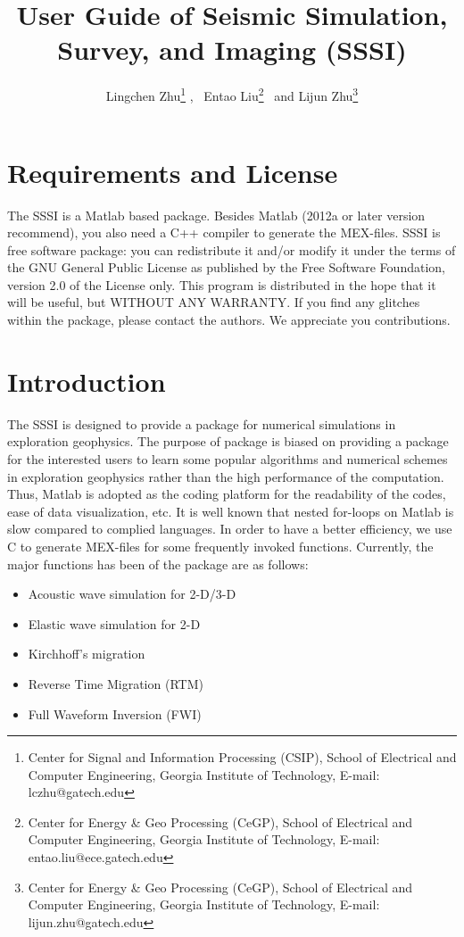 \documentclass[11pt]{article}
\theoremstyle{plain}
\theoremstyle{definition}
\theoremstyle{remark}
\numberwithin{equation}{section}
\begin{document}
\title{User Guide of Seismic Simulation, Survey, and Imaging (SSSI)}
\author{Lingchen Zhu\thanks{Center for Signal and Information Processing (CSIP), School of Electrical and Computer Engineering, Georgia Institute of Technology, 
E-mail: lczhu@gatech.edu} , \, Entao Liu\thanks{Center for Energy \& Geo Processing (CeGP), School of Electrical and Computer Engineering, Georgia Institute of Technology, E-mail: entao.liu@ece.gatech.edu} \, and Lijun Zhu\thanks{Center for Energy \& Geo Processing (CeGP), School of Electrical and Computer Engineering, Georgia Institute of Technology, E-mail: lijun.zhu@gatech.edu}} \maketitle
\tableofcontents
\newpage



\section{Requirements and License}
The SSSI is a Matlab based package. Besides Matlab (2012a or later version recommend), you also need a C++ compiler to generate the MEX-files. 
SSSI is free software package: you can redistribute it and/or modify it under the terms of the GNU General Public License as
published by the Free Software Foundation, version 2.0 of the License only. This program is distributed in the hope that 
it will be useful, but WITHOUT ANY WARRANTY. If you find any glitches within the package, please contact the authors. 
We appreciate you contributions. 



\section{Introduction}
The SSSI is designed to provide a package for numerical simulations in exploration geophysics. The purpose of package is biased on providing a package for the interested 
users to learn some popular algorithms and numerical schemes in exploration geophysics rather than the high performance of the computation. Thus, Matlab is adopted as the coding platform for the readability of the codes, ease of data visualization, etc. It is well known that nested for-loops on Matlab is slow compared to complied languages. In order to have a better efficiency, we use C to generate MEX-files for some frequently invoked functions.
Currently, the major functions has been of the package are as follows:
\begin{itemize}
\item Acoustic wave simulation for 2-D/3-D
\item Elastic wave simulation for 2-D
\item Kirchhoff's migration
\item Reverse Time Migration (RTM)
\item Full Waveform Inversion (FWI)
\end{itemize}
\end{document}

